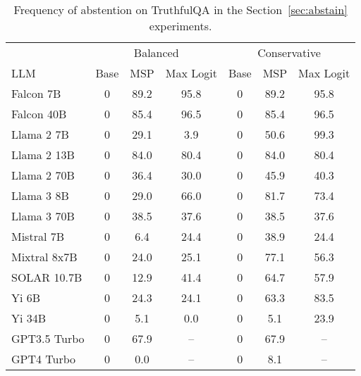 \begin{table*}[h]
\centering
\caption{Frequency of abstention on TruthfulQA in the Section~\ref{sec:abstain} experiments.}
\label{tab:truthfulqa_pct_abstained}
\begin{tabular}{lcccccc}
\toprule
& \multicolumn{3}{c}{Balanced} & \multicolumn{3}{c}{Conservative} \\ 
LLM & Base & MSP & Max Logit & Base & MSP & Max Logit \\ 
\cmidrule(lr){1-1}\cmidrule(lr){2-4}\cmidrule(lr){5-7} 
Falcon 7B & 0 & 89.2 & 95.8 & 0 & 89.2 & 95.8\\
Falcon 40B & 0 & 85.4 & 96.5 & 0 & 85.4 & 96.5\\
Llama 2 7B & 0 & 29.1 & 3.9 & 0 & 50.6 & 99.3\\
Llama 2 13B & 0 & 84.0 & 80.4 & 0 & 84.0 & 80.4\\
Llama 2 70B & 0 & 36.4 & 30.0 & 0 & 45.9 & 40.3\\
Llama 3 8B & 0 & 29.0 & 66.0 & 0 & 81.7 & 73.4\\
Llama 3 70B & 0 & 38.5 & 37.6 & 0 & 38.5 & 37.6\\
Mistral 7B & 0 & 6.4 & 24.4 & 0 & 38.9 & 24.4\\
Mixtral 8x7B & 0 & 24.0 & 25.1 & 0 & 77.1 & 56.3\\
SOLAR 10.7B & 0 & 12.9 & 41.4 & 0 & 64.7 & 57.9\\
Yi 6B & 0 & 24.3 & 24.1 & 0 & 63.3 & 83.5\\
Yi 34B & 0 & 5.1 & 0.0 & 0 & 5.1 & 23.9\\
GPT3.5 Turbo & 0 & 67.9 & -- & 0 & 67.9 & --\\
GPT4 Turbo & 0 & 0.0 & -- & 0 & 8.1 & --\\
\bottomrule
\end{tabular}
\end{table*}
